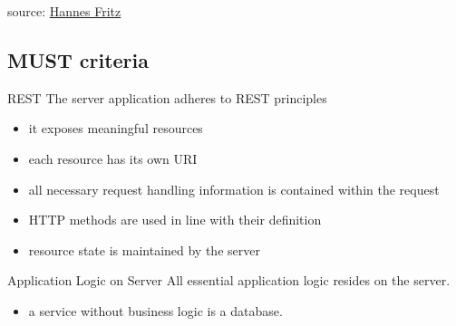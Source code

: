 \documentclass{beamer}
\begin{document}
{
  \begin{frame}
    \vspace*{2.65in}
    \tiny source: \href{http://www.flickr.com/photos/sensorsicht/5338348801/}{Hannes Fritz}

  \end{frame}
}

\subsection{MUST criteria}

\begin{frame}{REST}
  The server application adheres to REST principles

  \begin{itemize}
    \item it exposes meaningful resources
    \item each resource has its own URI
    \item all necessary request handling information is contained within the request
    \item HTTP methods are used in line with their definition
    \item resource state is maintained by the server
  \end{itemize}
\end{frame}

\begin{frame}{Application Logic on Server}
  All essential application logic resides on the server.

  \begin{itemize}
    \item a service without business logic is a database.
  \end{itemize}
\end{frame}
\end{document}
